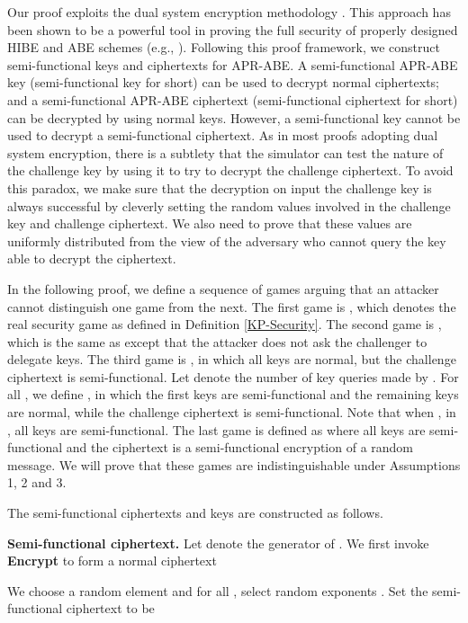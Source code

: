\documentclass[twocolumn]{svjour3}          \smartqed  \usepackage{graphicx}
\begin{document}
Our proof exploits the dual system encryption methodology \cite{Wat09}. This  approach  has been shown to be a powerful tool in proving the full security of properly designed HIBE and ABE schemes (e.g., \cite{LW10,LW11,LOS+10,Wat09}). Following this proof framework, we construct semi-functional keys and  ciphertexts for APR-ABE. A semi-functional APR-ABE key (semi-functional key for short) can be used to decrypt normal ciphertexts; and a semi-functional APR-ABE ciphertext (semi-functional ciphertext for short) can be decrypted by using normal keys. However, a semi-functional key cannot be used to decrypt a
semi-functional ciphertext. As in most proofs adopting dual system encryption, there is a subtlety that the simulator can test the nature of the challenge
key by using it to try to decrypt the challenge ciphertext. To avoid this paradox, we make sure that the decryption on input the challenge key is always
successful by cleverly setting the random values involved in the challenge key and challenge ciphertext. We also need to prove that these values are
uniformly distributed from the view of the adversary who cannot query the key able to decrypt the ciphertext.


In the following proof, we define a sequence of games arguing that an attacker cannot distinguish one game from the next. The first game is ,
which denotes the real security game as defined in Definition \ref{KP-Security}. The second game is , which is the same as 
except that the attacker  does not ask the challenger  to delegate keys. The third game is , in which all keys are normal, but the challenge ciphertext is semi-functional. Let  denote the number of key queries made by . For all , we define , in which the first  keys are semi-functional and the remaining keys are normal, while the challenge ciphertext is semi-functional. Note that when , in , all keys are semi-functional. The last game is defined as  where all keys are semi-functional and the ciphertext is a
semi-functional encryption of a random message. We will prove that these games are indistinguishable under Assumptions 1, 2 and 3.


The semi-functional ciphertexts and keys are constructed as follows.

\medskip
\noindent\textbf{Semi-functional ciphertext.} Let  denote the generator of . We first invoke \textbf{Encrypt} to form a normal
ciphertext

We choose a random element  and for all , select random exponents . Set the semi-functional ciphertext to be
\end{document}
